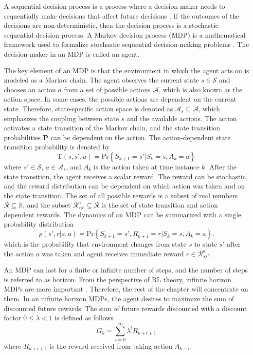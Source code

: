 \documentclass[english, 12pt, a4paper, elec, utf8, a-1b, online]{aaltothesis}
\numberwithin{equation}{section}
\renewcommand{\vec}[1]{\mathbf{#1}}
\newcommand{\Ss}{\mathcal{S}}
\newcommand{\As}{\mathcal{A}}
\newcommand{\Rs}{\mathcal{R}}
\renewcommand{\Pr}[1]{\text{Pr}\left\{ #1 \right\}}
\newcommand{\stprobs}{\vec{P}}
\newcommand{\real}{\mathbb{R}}
\begin{document}
A sequential decision process is a process where a decision-maker needs to sequentially make decisions that affect future decisions \cite{LaValle2006}.
If the outcomes of the decisions are non-deterministic, then the decision process is a stochastic sequential decision process.
A Markov decision process (MDP) is a mathematical framework used to formalize stochastic sequential decision-making problems \cite{Sutton2018}.
The decision-maker in an MDP is called an agent.

The key element of an MDP is that the environment in which the agent acts on is modeled as a Markov chain.
The agent observes the current state $s \in \Ss$ and chooses an action $a$ from a set of possible actions $\As$, which is also known as the action space.
In some cases, the possible actions are dependent on the current state.
Therefore, state-specific action space is denoted as $\As_s \subseteq \As$, which emphasizes the coupling between state $s$ and the available actions. 
The action activates a state transition of the Markov chain, and the state transition probabilities $\stprobs$ can be dependent on the action.
The action-dependent state transition probability is denoted by 
\begin{equation}\label{eq:mdp_st_prob}
    \mathrm{T}(s, s', a) = \Pr{S_{k+1}=s' | S_{k}=s , A_k=a}
\end{equation}
where $s' \in \Ss$, $a \in \As_s$, and $A_k$ is the action taken at time instance $k$.  
After the state transition, the agent receives a scalar reward.
The reward can be stochastic, and the reward distribution can be dependent on which action was taken and on the state transition.
The set of all possible rewards is a subset of real numbers $\Rs \subseteq \real$, and the subset $\Rs_{ss'}^a \subseteq \Rs$ is the set of state transition and action dependent rewards.
The dynamics of an MDP can be summarized with a single probability distribution
\begin{equation}\label{eq:MDP_probs}
    p(s', r | s, a) = \Pr{ S_{k+1}=s', R_{k+1}=r | S_k=s, A_k=a }.
\end{equation}
which is the probability that environment changes from state $s$ to state $s'$ after the action $a$ was taken and agent receives immediate reward $r \in \Rs_{ss'}^a$.

An MDP can last for a finite or infinite number of steps, and the number of steps is referred to as horizon.
From the perspective of RL theory, infinite horizon MDPs are more important \cite{Sutton2018}.
Therefore, the rest of the chapter will concentrate on them.
In an infinite horizon MDPs, the agent desires to maximize the sum of discounted future rewards.
The sum of future rewards discounted with a discount factor $0 \leq \lambda < 1$ is defined as follows
\begin{equation}\label{eq:discounted_sum}
    G_k = \sum_{i=0}^{\infty} \lambda^i R_{k + i + 1}
\end{equation}
where $R_{k+i+1}$ is the reward received from taking action $A_{k+i}$. 
\end{document}
